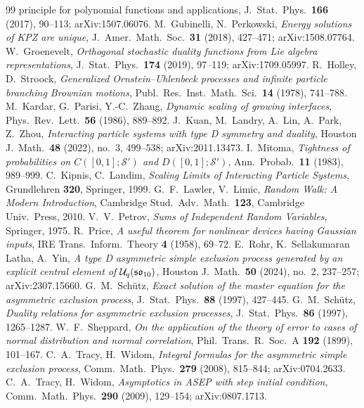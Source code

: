 \documentclass[11pt]{article}
\theoremstyle{plain}
\theoremstyle{definition}
\theoremstyle{remark}
\begin{document}
\begin{thebibliography}{99}
{principle for polynomial functions and applications}, J.~Stat.~Phys.~\textbf{166} (2017),
90--113; arXiv:1507.06076.
 M.~Gubinelli, N.~Perkowski, \emph{Energy solutions of KPZ are unique},
J.~Amer.~Math.~Soc.~\textbf{31} (2018), 427--471; arXiv:1508.07764.
 W.~Groenevelt, \emph{Orthogonal stochastic duality functions from Lie
algebra representations}, J.~Stat.~Phys.~\textbf{174} (2019), 97--119; arXiv:1709.05997.
 R.~Holley, D.~Stroock, \emph{Generalized Ornstein--Uhlenbeck
processes and infinite particle branching Brownian motions},
Publ.~Res.~Inst.~Math.~Sci.~\textbf{14} (1978), 741--788.
 M.~Kardar, G.~Parisi, Y.-C.~Zhang, \emph{Dynamic scaling of growing
interfaces}, Phys.~Rev.~Lett.~\textbf{56} (1986), 889--892.
 J.~Kuan, M.~Landry, A.~Lin, A.~Park, Z.~Zhou, \emph{Interacting particle
systems with type D symmetry and duality}, Houston J.~Math.~\textbf{48} (2022), no.~3,
499--538; arXiv:2011.13473.
 I.~Mitoma, \emph{Tightness of probabilities on
$C([0,1];\mathcal S')$ and $D([0,1];\mathcal S')$}, Ann.~Probab.~\textbf{11} (1983),
989--999.
 C.~Kipnis, C.~Landim, \emph{Scaling Limits of Interacting Particle Systems},
Grundlehren \textbf{320}, Springer, 1999.
 G.~F.~Lawler, V.~Limic, \emph{Random Walk: A Modern Introduction},
Cambridge Stud.~Adv.~Math.~\textbf{123}, Cambridge Univ.~Press, 2010.
 V.~V.~Petrov, \emph{Sums of Independent Random Variables}, Springer, 1975.
 R.~Price, \emph{A useful theorem for nonlinear devices having Gaussian
inputs}, IRE Trans.~Inform.~Theory \textbf{4} (1958), 69--72.
 E.~Rohr, K.~Sellakumaran Latha, A.~Yin, \emph{A type D asymmetric simple
exclusion process generated by an explicit central element of
$\mathcal U_q(\mathfrak{so}_{10})$}, Houston J.~Math.~\textbf{50} (2024), no.~2, 237--257;
arXiv:2307.15660.
 G.~M.~Sch\"utz, \emph{Exact solution of the master equation for the
asymmetric exclusion process}, J.~Stat.~Phys.~\textbf{88} (1997), 427--445.
 G.~M.~Sch\"utz, \emph{Duality relations for asymmetric exclusion
processes}, J.~Stat.~Phys.~\textbf{86} (1997), 1265--1287.
 W.~F.~Sheppard, \emph{On the application of the theory of error to cases
of normal distribution and normal correlation}, Phil.~Trans.~R.~Soc.~A \textbf{192}
(1899), 101--167.
 C.~A.~Tracy, H.~Widom, \emph{Integral formulas for the asymmetric simple
exclusion process}, Comm.~Math.~Phys.~\textbf{279} (2008), 815--844; arXiv:0704.2633.
 C.~A.~Tracy, H.~Widom, \emph{Asymptotics in ASEP with step initial condition}, Comm.~Math.~Phys.~\textbf{290} (2009), 129--154; arXiv:0807.1713.
\end{thebibliography}
\end{document}
